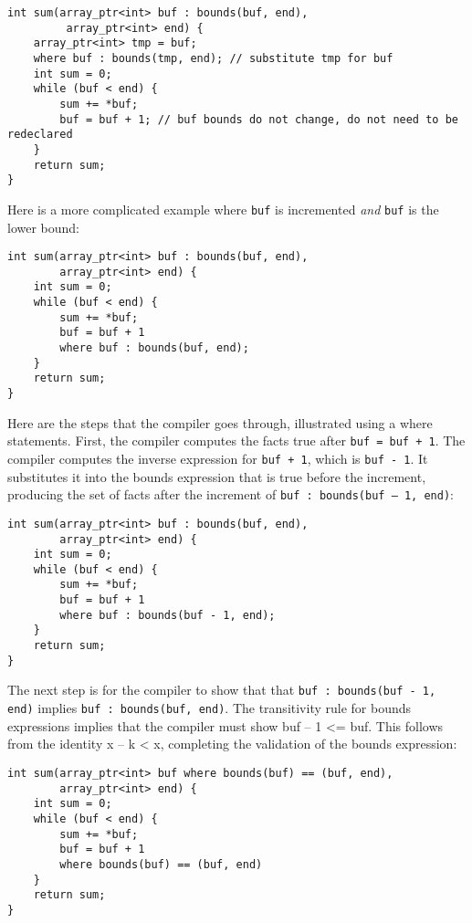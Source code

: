 \begin{verbatim}
int sum(array_ptr<int> buf : bounds(buf, end), 
         array_ptr<int> end) {
    array_ptr<int> tmp = buf;
    where buf : bounds(tmp, end); // substitute tmp for buf
    int sum = 0;
    while (buf < end) {
        sum += *buf;   
        buf = buf + 1; // buf bounds do not change, do not need to be redeclared
    }
    return sum;
}
\end{verbatim}

Here is a more complicated example where \texttt{buf} is incremented
\emph{and} \texttt{buf} is the lower bound:

\begin{verbatim}
int sum(array_ptr<int> buf : bounds(buf, end), 
        array_ptr<int> end) {
    int sum = 0;
    while (buf < end) {
        sum += *buf;   
        buf = buf + 1
        where buf : bounds(buf, end);
    }
    return sum;
}
\end{verbatim}

Here are the steps that the compiler goes through, illustrated using a
where statements. First, the compiler computes the facts true after
\texttt{buf = buf + 1}. The compiler computes the inverse expression for
\texttt{buf + 1}, which is \texttt{buf - 1}. It substitutes it into the
bounds expression that is true before the increment, producing the set
of facts after the increment of \texttt{buf : bounds(buf -- 1, end)}:

\begin{verbatim}
int sum(array_ptr<int> buf : bounds(buf, end), 
        array_ptr<int> end) {
    int sum = 0;
    while (buf < end) {
        sum += *buf;   
        buf = buf + 1
        where buf : bounds(buf - 1, end); 
    }
    return sum;
}
\end{verbatim}

The next step is for the compiler to show that that \texttt{buf :
bounds(buf - 1, end)} implies \texttt{buf : bounds(buf, end)}. The
transitivity rule for bounds expressions implies that the compiler must
show buf -- 1 \textless{}= buf. This follows from the identity x -- k
\textless{} x, completing the validation of the bounds expression:

\begin{verbatim}
int sum(array_ptr<int> buf where bounds(buf) == (buf, end), 
        array_ptr<int> end) {
    int sum = 0;
    while (buf < end) {
        sum += *buf;   
        buf = buf + 1
        where bounds(buf) == (buf, end) 
    }
    return sum;
}
\end{verbatim}